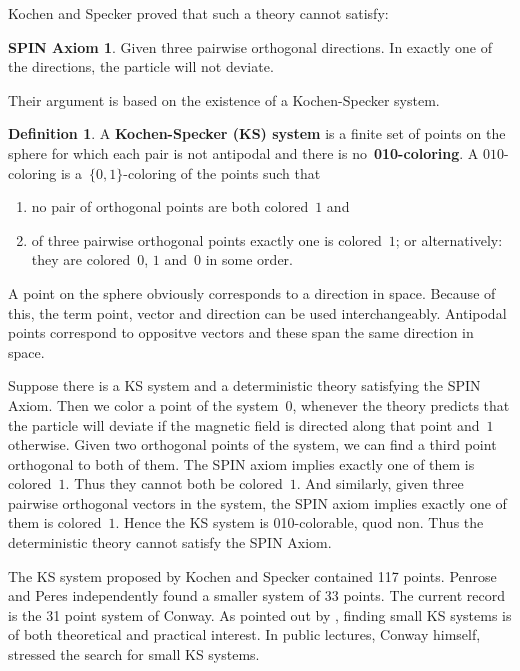 \documentclass[a4paper]{article}
\newcommand{\keyword}[1]{\textbf{#1}}
\newcounter{main}
\theoremstyle{definition}
\newtheorem{dfn}[main]{Definition}
\newtheorem*{spin}{SPIN Axiom \cite{ck09}}
\theoremstyle{remark}
\begin{document}
Kochen and Specker proved that such a theory cannot satisfy:
\begin{spin}
    Given three pairwise orthogonal directions.
    In exactly one of the directions, the particle will not deviate.
\end{spin}
Their argument is based on the existence of a Kochen-Specker system.
\begin{dfn}
    A \keyword{Kochen-Specker (KS) system} is
    a finite set of points on the sphere
    for which each pair is not antipodal and
    there is no~\keyword{010-coloring}.
    A $010$-coloring is a~$\{0,1\}$-coloring of the points such that
    \begin{enumerate}
        \item
            no pair of orthogonal points are both colored~$1$ and
        \item
            of three pairwise orthogonal points exactly one is colored~$1$;
            or alternatively: they are colored~$0$, $1$ and~$0$ in some order.
    \end{enumerate}
\end{dfn}
A point on the sphere obviously corresponds to a direction in space.
Because of this, the term point, vector and direction
can be used interchangeably. Antipodal points correspond to oppositve
vectors and these span the same direction in space.

Suppose there is a KS system and  a deterministic theory satisfying
the SPIN Axiom.
Then we color a point of the system~$0$,
whenever the theory predicts that the particle will deviate
if the magnetic field is directed along that point and~$1$ otherwise.
Given two orthogonal points of the system,
we can find a third point orthogonal to both of them.
The SPIN axiom implies exactly one of them is colored~$1$.
Thus they cannot both be colored~$1$.
And similarly, given three pairwise orthogonal vectors in the system,
the SPIN axiom implies exactly one of them is colored~$1$.
Hence the KS system is 010-colorable, quod non.  Thus the deterministic theory
cannot satisfy the SPIN Axiom.

The KS system proposed by Kochen and Specker contained 117 points\cite{ks}.
Penrose and Peres independently found a smaller system of 33 points.
The current record is the 31 point system of Conway.
As pointed out by \cite{c00,aow11}, finding small KS systems
is of both theoretical and practical interest.
In public lectures, Conway himself, stressed the search for small KS systems.
\end{document}
